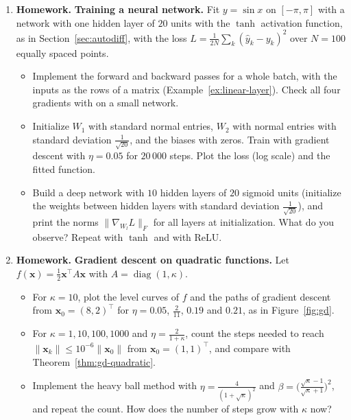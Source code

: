 \documentclass[11pt]{article}
\newcommand{\homework}{\textcolor{red!70!black}{\textbf{Homework.}}}
\newcommand{\py}[1]{\texttt{\detokenize{#1}}}
\newcommand{\norm}[1]{\lVert #1 \rVert}
\theoremstyle{definition}
\theoremstyle{plain}
\theoremstyle{remark}
\DeclareMathOperator{\diag}{diag}
\begin{document}
\begin{enumerate}[label=\textbf{P\arabic*.}, leftmargin=*]
    \item \homework{} \textbf{Training a neural network.} Fit $y = \sin x$ on $[-\pi, \pi]$ with a network with one hidden layer of $20$ units with the $\tanh$ activation function, as in Section~\ref{sec:autodiff}, with the loss $L = \frac{1}{2N}\sum_k (\hat y_k - y_k)^2$ over $N = 100$ equally spaced points.
    \begin{itemize}
        \item Implement the forward and backward passes for a whole batch, with the inputs as the rows of a matrix (Example~\ref{ex:linear-layer}). Check all four gradients with \py{numerical_gradient} on a small network.
        \item Initialize $W_1$ with standard normal entries, $W_2$ with normal entries with standard deviation $\frac{1}{\sqrt{20}}$, and the biases with zeros. Train with gradient descent with $\eta = 0.05$ for $20\,000$ steps. Plot the loss (log scale) and the fitted function.
        \item Build a deep network with $10$ hidden layers of $20$ sigmoid units (initialize the weights between hidden layers with standard deviation $\frac{1}{\sqrt{20}}$), and print the norms $\norm{\nabla_{W_l} L}_F$ for all layers at initialization. What do you observe? Repeat with $\tanh$ and with ReLU.
    \end{itemize}

    \item \homework{} \textbf{Gradient descent on quadratic functions.} Let $f(\mathbf{x}) = \frac{1}{2}\mathbf{x}^\top A\mathbf{x}$ with $A = \diag(1, \kappa)$.
    \begin{itemize}
        \item For $\kappa = 10$, plot the level curves of $f$ and the paths of gradient descent from $\mathbf{x}_0 = (8, 2)^\top$ for $\eta = 0.05$, $\frac{2}{11}$, $0.19$ and $0.21$, as in Figure~\ref{fig:gd}.
        \item For $\kappa = 1, 10, 100, 1000$ and $\eta = \frac{2}{1 + \kappa}$, count the steps needed to reach $\norm{\mathbf{x}_k} \leq 10^{-6}\norm{\mathbf{x}_0}$ from $\mathbf{x}_0 = (1, 1)^\top$, and compare with Theorem~\ref{thm:gd-quadratic}.
        \item Implement the heavy ball method with $\eta = \frac{4}{(1 + \sqrt{\kappa})^2}$ and $\beta = \big(\frac{\sqrt{\kappa} - 1}{\sqrt{\kappa} + 1}\big)^2$, and repeat the count. How does the number of steps grow with $\kappa$ now?
    \end{itemize}


\end{enumerate}
\end{document}
